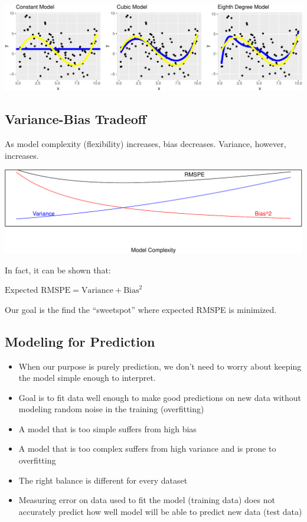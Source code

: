 \documentclass[
  letterpaper,
  DIV=11,
  numbers=noendperiod]{scrreprt}
\providecommand{\tightlist}{%
  \setlength{\itemsep}{0pt}\setlength{\parskip}{0pt}}\usepackage{longtable,booktabs,array}
\begin{document}
\includegraphics{Ch7_files/figure-pdf/unnamed-chunk-25-1.pdf}

\subsection{Variance-Bias Tradeoff}\label{variance-bias-tradeoff-1}

As model complexity (flexibility) increases, bias decreases. Variance,
however, increases.

\includegraphics{Ch7_files/figure-pdf/unnamed-chunk-26-1.pdf}

In fact, it can be shown that:

\(\text{Expected RMSPE} = \text{Variance} + \text{Bias}^2\)

Our goal is the find the ``sweetspot'' where expected RMSPE is
minimized.

\subsection{Modeling for Prediction}\label{modeling-for-prediction-1}

\begin{itemize}
\tightlist
\item
  When our purpose is purely prediction, we don't need to worry about
  keeping the model simple enough to interpret.\\
\item
  Goal is to fit data well enough to make good predictions on new data
  without modeling random noise in the training (overfitting)\\
\item
  A model that is too simple suffers from high bias\\
\item
  A model that is too complex suffers from high variance and is prone to
  overfitting\\
\item
  The right balance is different for every dataset\\
\item
  Measuring error on data used to fit the model (training data) does not
  accurately predict how well model will be able to predict new data
  (test data)
\end{itemize}
\end{document}
